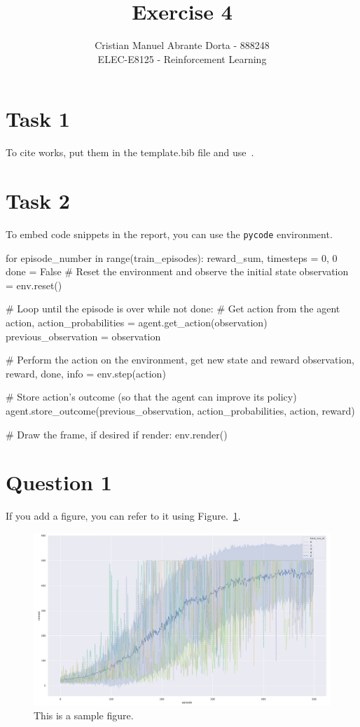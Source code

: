 \documentclass[12pt]{article}
\begin{document}
 
\title{Exercise 4}
\author{Cristian Manuel Abrante Dorta - 888248\\
ELEC-E8125 - Reinforcement Learning}

\maketitle
\section{Task 1}
To cite works, put them in the template.bib file and use~\cite{sutton2018reinforcement}.

\section{Task 2}
To embed code snippets in the report, you can use the \texttt{pycode} environment.

\begin{pycode}
for episode_number in range(train_episodes):
    reward_sum, timesteps = 0, 0
    done = False
    # Reset the environment and observe the initial state
    observation = env.reset()

    # Loop until the episode is over
    while not done:
        # Get action from the agent
        action, action_probabilities = agent.get_action(observation)
        previous_observation = observation

        # Perform the action on the environment, get new state and reward
        observation, reward, done, info = env.step(action)

        # Store action's outcome (so that the agent can improve its policy)
        agent.store_outcome(previous_observation, action_probabilities, action, reward)

        # Draw the frame, if desired
        if render:
            env.render()
\end{pycode}

\section{Question 1}

If you add a figure, you can refer to it using Figure.~\ref*{fig:fig1}.

\begin{figure}[h] 
	\centering  %
    \includegraphics[width=0.9\columnwidth]{img/training.pdf}
	\caption{This is a sample figure.}
	\label{fig:fig1}
\end{figure}


\end{document}

